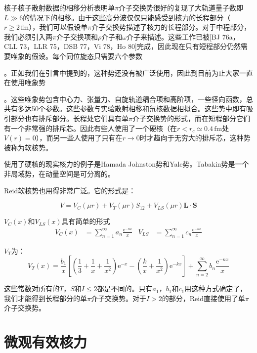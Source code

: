 核子核子散射数据的相移分析表明单$\pi$介子交换势很好的复现了大轨道量子数即$L\gg6$的情况下的相移\cite{Br67b}。由于这些高分波仅仅只能感受到核力的长程部分（$r\geq2\,\text{fm}$），我们可以假设单$\pi$介子交换势描述了核力的长程部分。对于中程部分，我们必须引入两$\pi$介子交换项和$\rho$介子和$\omega$介子来描述。这些工作已被{[}BJ
76a，CLL 73，LLR 75，DSB 77，Vi 78，Ho 80{]}完成，因此现在只有短程部分仍然需要唯象的假设。每个同位旋态只需要六个参数

。正如我们在引言中提到的，这种势还没有被广泛使用，因此到目前为止大家一直在使用唯象势

。这些唯象势包含中心力、张量力、自旋轨道耦合项和高阶项，一些径向函数，总共有多达50个参数。这些参数与实验散射相移和氘核数据相拟合。这些势中即有吸引部分也有排斥部分。长程处它们具有单$\pi$介子交换势的形式，而在短程部分它们有一个非常强的排斥芯。因此有些人使用了一个硬核（在$r<r_{c}\simeq0.4\,\text{fm}$处$V(r)=0$），而另一些人使用了只有在$r\rightarrow0$时才趋向于无穷大的排斥芯，这种势被称为软核势。

使用了硬核的现实核力的例子是Hamada Johnston势\cite{HJ62}和Yale势\cite{LHR62}。Tabakin势\cite{Ta64}是一个非局域势，在动量空间是可分离的。

Reid软核势\cite{Re68}也用得非常广泛。它的形式是：

\[
V=V_{C}(\mu r)+V_{T}(\mu r)S_{12}+V_{LS}(\mu r)\boldsymbol{L}\cdot\boldsymbol{S}
\]

$V_{C}(x)$和$V_{LS}(x)$具有简单的形式
\begin{align*}
V_{C}(x) & =\sum^{\infty}_{n=1}a_{n}\frac{\mathrm{e}^{-nx}}{x} & V_{LS} & =\sum^{\infty}_{n=1}c_{n}\frac{\mathrm{e}^{-nx}}{x}
\end{align*}

$V_{T}$为：
\[
V_{T}(x)=\frac{b_{1}}{x}\left[\left(\frac{1}{3}+\frac{1}{x}+\frac{1}{x^{2}}\right)\mathrm{e}^{-x}-\left(\frac{k}{x}+\frac{1}{x^{2}}\right)\mathrm{e}^{-kx}\right]+\sum^{\infty}_{n=2}b_{n}\frac{\mathrm{e}^{-nx}}{x}
\]

这些常数对所有的$T$，$S$和$I\leq2$都是不同的。只有$a_{1}$，$b_{1}$和$c_{1}$用这种方式确定了，我们才能得到长程部分的单$\pi$介子交换势。对于$I>2$的部分，Reid直接使用了单$\pi$介子交换势。

\section{微观有效核力\label{sec:=005FAE=0089C2=006709=006548=006838=00529B}}

